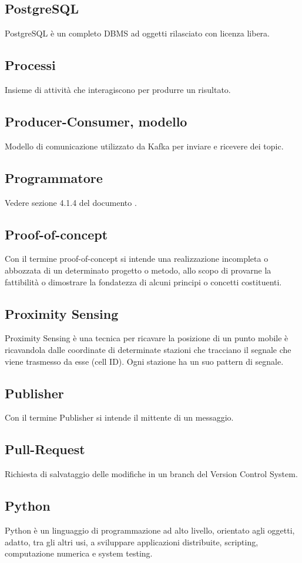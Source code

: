 \subsection{PostgreSQL}  PostgreSQL è un completo DBMS ad oggetti rilasciato con licenza libera.
\subsection{Processi}  Insieme di attività che interagiscono per produrre un risultato.
\subsection{Producer-Consumer, modello}  Modello di comunicazione utilizzato da Kafka per inviare e ricevere dei topic.
\subsection{Programmatore}  Vedere sezione 4.1.4 del documento .
\subsection{Proof-of-concept }  Con il termine proof-of-concept si intende una realizzazione incompleta o abbozzata di un determinato progetto o metodo, allo scopo di provarne la fattibilità o dimostrare la fondatezza di alcuni principi o concetti costituenti.
\subsection{Proximity Sensing}  Proximity Sensing è una tecnica per ricavare la posizione di un punto mobile è ricavandola dalle coordinate di determinate stazioni che tracciano il segnale che viene trasmesso da esse (cell ID). Ogni stazione ha un suo pattern di segnale.
\subsection{Publisher}  Con il termine Publisher si intende il mittente di un messaggio.
\subsection{Pull-Request}  Richiesta di salvataggio delle modifiche in un branch del Version Control System.
\subsection{Python}  Python è un linguaggio di programmazione ad alto livello, orientato agli oggetti, adatto, tra gli altri usi, a sviluppare applicazioni distribuite, scripting, computazione numerica e system testing.

